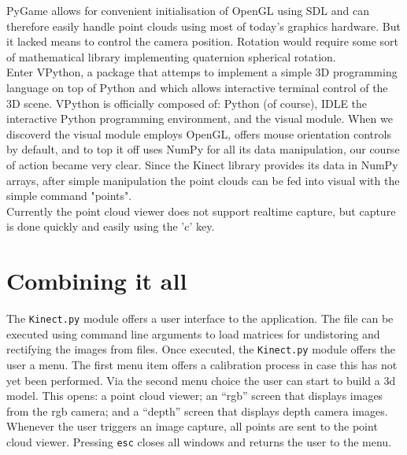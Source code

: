 PyGame allows for convenient initialisation of OpenGL using SDL and can
therefore easily handle point clouds using most of today's graphics hardware.
But it lacked means to control the camera position. Rotation would require some
sort of mathematical library implementing quaternion spherical rotation.\\

Enter VPython, a package that attemps to implement a simple 3D programming
language on top of Python and which allows interactive terminal control of the
3D scene. VPython is officially composed of: Python (of course), IDLE the
interactive Python programming environment, and the visual module. When we
discoverd the visual module employs OpenGL, offers mouse orientation controls by
default, and to top it off uses NumPy for all its data manipulation, our course
of action became very clear. Since the Kinect library provides its data in NumPy
arrays, after simple manipulation the point clouds can be fed into visual with
the simple command "points".\\

Currently the point cloud viewer does not support realtime capture, but capture
is done quickly and easily using the 'c' key.\\


\section{Combining it all}


The \texttt{Kinect.py} module offers a user interface to the application. The
file can be executed using command line arguments to load matrices for
undistoring and rectifying the images from files. Once executed, the
\texttt{Kinect.py} module offers the user a menu. The first menu item offers a
calibration process in case this has not yet been performed. Via the second
menu choice the user can start to build a 3d model. This opens: a point cloud
viewer; an ``rgb'' screen that displays images from the rgb camera; and a
``depth'' screen that displays depth camera images. Whenever the user triggers
an image capture, all points are sent to the point cloud viewer. Pressing
\texttt{esc} closes all windows and returns the user to the menu.
